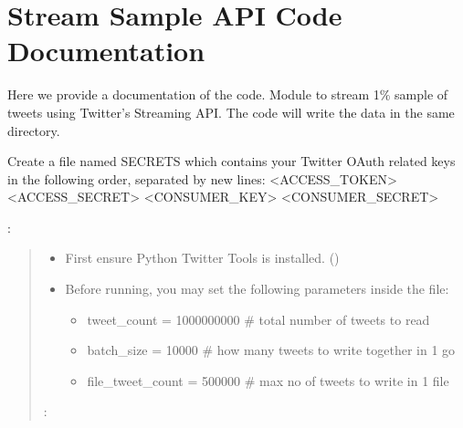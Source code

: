 \documentclass[letterpaper,10pt,english]{sphinxmanual}
\begin{document}
\section{Stream Sample API Code Documentation}
\label{\detokenize{twitter_stream:stream-sample-api-code-documentation}}
Here we provide a documentation of the code.
\label{\detokenize{twitter_stream:module-streaming}}
Module to stream 1\% sample of tweets using Twitter’s Streaming API. The code will write the data in the same directory.

Create a file named SECRETS which contains your Twitter OAuth related keys in the following order, separated by new lines:
\textless{}ACCESS\_TOKEN\textgreater{}
\textless{}ACCESS\_SECRET\textgreater{}
\textless{}CONSUMER\_KEY\textgreater{}
\textless{}CONSUMER\_SECRET\textgreater{}

:
\begin{quote}
\begin{itemize}
\item {} 
First ensure Python Twitter Tools is installed. ()

\item {} 
Before running, you may set the following parameters inside the file:
\begin{itemize}
\item {} 
tweet\_count = 1000000000 \# total number of tweets to read

\item {} 
batch\_size = 10000 \# how many tweets to write together in 1 go

\item {} 
file\_tweet\_count = 500000 \# max no of tweets to write in 1 file

\end{itemize}

\end{itemize}

:
\end{quote}
\end{document}
